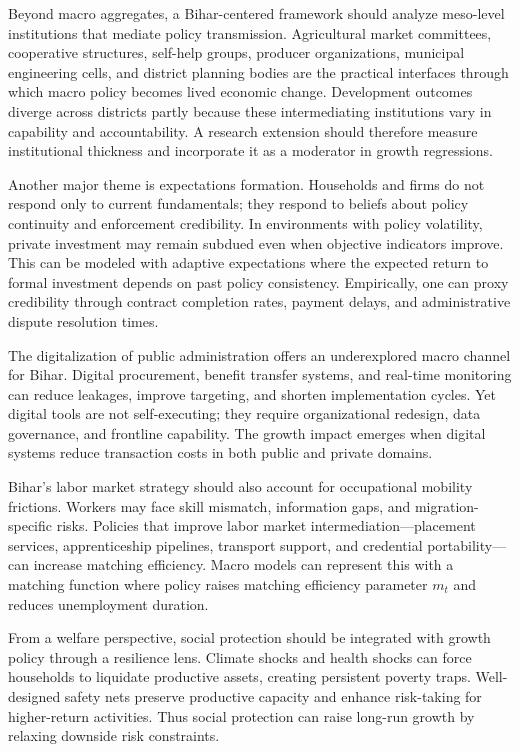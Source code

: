 \documentclass[preprint,12pt]{elsarticle}
\begin{document}
Beyond macro aggregates, a Bihar-centered framework should analyze meso-level institutions that mediate policy transmission. Agricultural market committees, cooperative structures, self-help groups, producer organizations, municipal engineering cells, and district planning bodies are the practical interfaces through which macro policy becomes lived economic change. Development outcomes diverge across districts partly because these intermediating institutions vary in capability and accountability. A research extension should therefore measure institutional thickness and incorporate it as a moderator in growth regressions.

Another major theme is expectations formation. Households and firms do not respond only to current fundamentals; they respond to beliefs about policy continuity and enforcement credibility. In environments with policy volatility, private investment may remain subdued even when objective indicators improve. This can be modeled with adaptive expectations where the expected return to formal investment depends on past policy consistency. Empirically, one can proxy credibility through contract completion rates, payment delays, and administrative dispute resolution times.

The digitalization of public administration offers an underexplored macro channel for Bihar. Digital procurement, benefit transfer systems, and real-time monitoring can reduce leakages, improve targeting, and shorten implementation cycles. Yet digital tools are not self-executing; they require organizational redesign, data governance, and frontline capability. The growth impact emerges when digital systems reduce transaction costs in both public and private domains.

Bihar's labor market strategy should also account for occupational mobility frictions. Workers may face skill mismatch, information gaps, and migration-specific risks. Policies that improve labor market intermediation---placement services, apprenticeship pipelines, transport support, and credential portability---can increase matching efficiency. Macro models can represent this with a matching function where policy raises matching efficiency parameter $m_t$ and reduces unemployment duration.

From a welfare perspective, social protection should be integrated with growth policy through a resilience lens. Climate shocks and health shocks can force households to liquidate productive assets, creating persistent poverty traps. Well-designed safety nets preserve productive capacity and enhance risk-taking for higher-return activities. Thus social protection can raise long-run growth by relaxing downside risk constraints.
\end{document}
